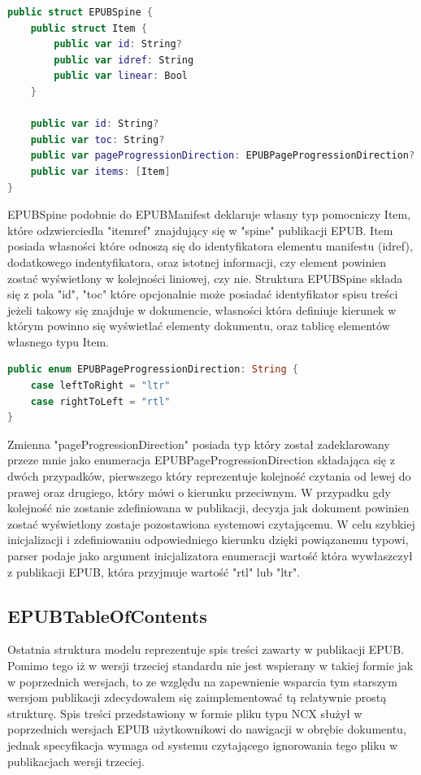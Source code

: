 \begin{lstlisting}[caption={Struktura EPUBSpine.}, language=swift]
public struct EPUBSpine {
    public struct Item {
        public var id: String?
        public var idref: String
        public var linear: Bool
    }

    public var id: String?
    public var toc: String?
    public var pageProgressionDirection: EPUBPageProgressionDirection?
    public var items: [Item]
}
\end{lstlisting}

EPUBSpine podobnie do EPUBManifest deklaruje własny typ pomocniczy Item, które odzwierciedla "itemref" znajdujący się w "spine" publikacji EPUB. Item posiada własności które odnoszą się do identyfikatora elementu manifestu (idref), dodatkowego indentyfikatora, oraz istotnej informacji, czy element powinien zostać wyświetlony w kolejności liniowej, czy nie. Struktura EPUBSpine składa się z pola "id", "toc" które opcjonalnie może posiadać identyfikator spisu treści jeżeli takowy się znajduje w dokumencie, własności która definiuje kierunek w którym powinno się wyświetlać elementy dokumentu, oraz tablicę elementów własnego typu Item.

\begin{lstlisting}[language=swift]
public enum EPUBPageProgressionDirection: String {
    case leftToRight = "ltr"
    case rightToLeft = "rtl"
}
\end{lstlisting}

Zmienna "pageProgressionDirection" posiada typ który został zadeklarowany przeze mnie jako enumeracja EPUBPageProgressionDirection składająca się z dwóch przypadków, pierwszego który reprezentuje kolejność czytania od lewej do prawej oraz drugiego, który mówi o kierunku przeciwnym. W przypadku gdy kolejność nie zostanie zdefiniowana w publikacji, decyzja jak dokument powinien zostać wyświetlony zostaje pozostawiona systemowi czytającemu. W celu szybkiej inicjalizacji i zdefiniowaniu odpowiedniego kierunku dzięki powiązanemu typowi, parser podaje jako argument inicjalizatora enumeracji wartość która wywłaszczył z publikacji EPUB, która przyjmuje wartość "rtl" lub "ltr".

\subsection{EPUBTableOfContents}

Ostatnia struktura modelu reprezentuje spis treści zawarty w publikacji EPUB. Pomimo tego iż w wersji trzeciej standardu nie jest wspierany w takiej formie jak w poprzednich wersjach, to ze względu na zapewnienie wsparcia tym starszym wersjom publikacji zdecydowałem się zaimplementować tą relatywnie prostą strukturę. Spis treści przedstawiony w formie pliku typu NCX służył w poprzednich wersjach EPUB użytkownikowi do nawigacji w obrębie dokumentu, jednak specyfikacja wymaga od systemu czytającego ignorowania tego pliku w publikacjach wersji trzeciej.

